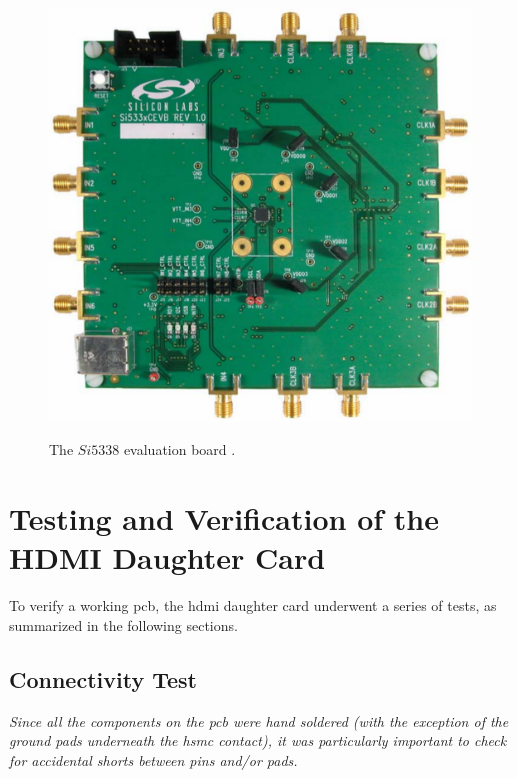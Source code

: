 \documentclass[main.tex]{subfiles}
\begin{document}
\begin{figure} %
\begin{center}
\includegraphics[scale=0.3]{../img/si5338}  \\[0.1 cm]
\caption{The $Si5338$ evaluation board \cite{si16}.}
\label{fig:si5338}
\end{center}
\end{figure} 

\newpage
\section{Testing and Verification of the HDMI Daughter Card}
To verify a working \gls{pcb}, the \gls{hdmi} daughter card underwent a series of tests, as summarized in the following sections. 

\subsection{Connectivity Test}

\textit{Since all the components on the \gls{pcb} were hand soldered (with the exception of the ground pads underneath the \gls{hsmc} contact), it was particularly important to check for accidental shorts between pins and/or pads.}
\end{document}
